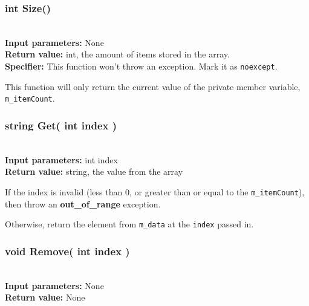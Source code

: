 \documentclass[a4paper,12pt]{book}
\begin{document}
    \hrulefill
    \subsubsection*{int Size()}

    \begin{framed} ~\\
        \textbf{Input parameters:} None \\
        \textbf{Return value:} int, the amount of items stored in the array. \\
        \textbf{Specifier:} This function won't throw an exception. Mark it as \texttt{noexcept}.
    \end{framed}

    This function will only return the current value of the
    private member variable, \texttt{m\_itemCount}.


    \hrulefill
    \subsubsection*{string Get( int index )}

    \begin{framed} ~\\
        \textbf{Input parameters:} int index \\
        \textbf{Return value:} string, the value from the array
    \end{framed}

    If the index is invalid (less than 0, or greater than or equal to
    the \texttt{m\_itemCount}), then throw an \textbf{out\_of\_range}
    exception.

    Otherwise, return the element from \texttt{m\_data} at the \texttt{index}
    passed in.




    \newpage
    \subsubsection*{void Remove( int index )}

    \begin{framed} ~\\
        \textbf{Input parameters:} None \\
        \textbf{Return value:} None
    \end{framed}
\end{document}
